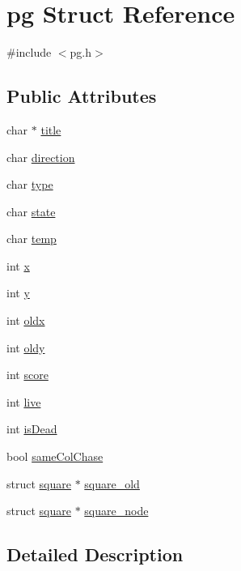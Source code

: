 \hypertarget{structpg}{\section{pg Struct Reference}
\label{structpg}
}


{\ttfamily \#include $<$pg.\-h$>$}

\subsection*{Public Attributes}
\begin{DoxyCompactItemize}
\item 
char $\ast$ \hyperlink{structpg_a405000c411bc2e7a549613d36c390bb3}{title}
\item 
char \hyperlink{structpg_a316ca3ecda285dccada164e82e24ea87}{direction}
\item 
char \hyperlink{structpg_a96e9a877e6de161590f9353c722766e7}{type}
\item 
char \hyperlink{structpg_af135bcefc8517a60112ce65e20786b91}{state}
\item 
char \hyperlink{structpg_a7febad91bca295daef0bfe2a51b7cdd4}{temp}
\item 
int \hyperlink{structpg_ac12975fdeabe97e5171ea39edb57c4e7}{x}
\item 
int \hyperlink{structpg_ae989f1228cbfc5e45dc4d10705b5484e}{y}
\item 
int \hyperlink{structpg_aefa92faaea6ca845fab464254844d3d0}{oldx}
\item 
int \hyperlink{structpg_a3ef8ab3103efcd9f742da765501685a3}{oldy}
\item 
int \hyperlink{structpg_a3f4280c7c54a1788967649d7e044cd16}{score}
\item 
int \hyperlink{structpg_a4b8d3a6539dc40849f385521deff7b8e}{live}
\item 
int \hyperlink{structpg_a45f051274aa5b8afd7880d502398c704}{is\-Dead}
\item 
bool \hyperlink{structpg_aa4327d97fd1bdb12a750625e88b499da}{same\-Col\-Chase}
\item 
struct \hyperlink{structsquare}{square} $\ast$ \hyperlink{structpg_a1c10440d8d1646e404190da0bbfa68ce}{square\-\_\-old}
\item 
struct \hyperlink{structsquare}{square} $\ast$ \hyperlink{structpg_a6210bbfa47c8aecec8e0b8c0bcd453d6}{square\-\_\-node}
\end{DoxyCompactItemize}


\subsection{Detailed Description}


